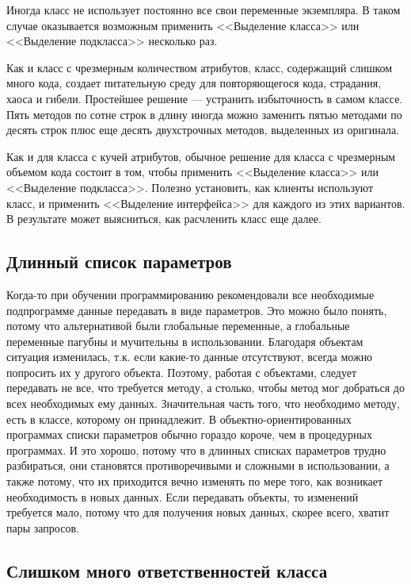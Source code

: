 \documentclass{../../text-style}
\begin{document}
Иногда класс не использует постоянно все свои переменные экземпляра. В таком случае оказывается возможным применить <<Выделение класса>> или <<Выделение подкласса>> несколько раз.

Как и класс с чрезмерным количеством атрибутов, класс, содержащий слишком много кода, создает питательную среду для повторяющегося кода, страдания, хаоса и гибели. Простейшее решение --- устранить избыточность в самом классе. Пять методов по сотне строк в длину иногда можно заменить пятью методами по десять строк плюс еще десять двухстрочных методов, выделенных из оригинала.

Как и для класса с кучей атрибутов, обычное решение для класса с чрезмерным объемом кода состоит в том, чтобы применить <<Выделение класса>> или <<Выделение подкласса>>. Полезно установить, как клиенты используют класс, и применить <<Выделение интерфейса>> для каждого из этих вариантов. В результате может выясниться, как расчленить класс еще далее.

\subsection{Длинный список параметров}

Когда-то при обучении программированию рекомендовали все необходимые подпрограмме данные передавать в виде параметров. Это можно было понять, потому что альтернативой были глобальные переменные, а глобальные переменные пагубны и мучительны в использовании. Благодаря объектам ситуация изменилась, т.к. если какие-то данные отсутствуют, всегда можно попросить их у другого объекта. Поэтому, работая с объектами, следует передавать не все, что требуется методу, а столько, чтобы метод мог добраться до всех необходимых ему данных. Значительная часть того, что необходимо методу, есть в классе, которому он принадлежит. В объектно-ориентированных программах списки параметров обычно гораздо короче, чем в процедурных программах. И это хорошо, потому что в длинных списках параметров трудно разбираться, они становятся противоречивыми и сложными в использовании, а также потому, что их приходится вечно изменять по мере того, как возникает необходимость в новых данных. Если передавать объекты, то изменений требуется мало, потому что для получения новых данных, скорее всего, хватит пары запросов.

\subsection{Слишком много ответственностей класса}
\end{document}
